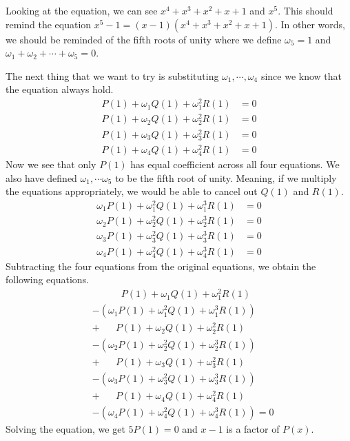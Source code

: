 \documentclass[../../main.tex]{subfiles}
\begin{document}
\begin{solution}
Looking at the equation, we can see $x^4 + x^3 + x^2 + x + 1$ and
$x^5$. This should remind the equation $x^5 - 1 = (x - 1)
(x^4 + x^3 + x^2 + x + 1)$. In other words, we should be reminded of
the fifth roots of unity where we define $\omega_5 = 1$ and
$\omega_1 + \omega_2 + \cdots + \omega_5 = 0$.

The next thing that we want to try is substituting $\omega_1, \cdots,
\omega_4$ since we know that the equation always hold.
\begin{align*}
    P(1) + \omega_1 Q(1) + \omega_1^2 R(1) &= 0 \\
    P(1) + \omega_2 Q(1) + \omega_2^2 R(1) &= 0 \\
    P(1) + \omega_3 Q(1) + \omega_3^2 R(1) &= 0 \\
    P(1) + \omega_4 Q(1) + \omega_4^2 R(1) &= 0
\end{align*}
Now we see that only $P(1)$ has equal coefficient across all four
equations. We also have defined $\omega_1, \cdots \omega_5$ to be
the fifth root of unity. Meaning, if we multiply the equations
appropriately, we would be able to cancel out $Q(1)$ and $R(1)$.
\begin{align*}
    \omega_1 P(1) + \omega_1^2 Q(1) + \omega_1^3 R(1) &= 0 \\
    \omega_2 P(1) + \omega_2^2 Q(1) + \omega_2^3 R(1) &= 0 \\
    \omega_3 P(1) + \omega_3^2 Q(1) + \omega_3^3 R(1) &= 0 \\
    \omega_4 P(1) + \omega_4^2 Q(1) + \omega_4^3 R(1) &= 0
\end{align*}
Subtracting the four equations from the original equations,
we obtain the following equations.
\begin{align*}
    &\qquad\quad P(1) + \omega_1 Q(1) + \omega_1^2 R(1) \\
    &-\left(
        \omega_1 P(1) + \omega_1^2 Q(1) + \omega_1^3 R(1)
    \right) \\
    &+ \quad\ \ \ P(1) + \omega_2 Q(1) + \omega_2^2 R(1) \\
    &-\left(
        \omega_2 P(1) + \omega_2^2 Q(1) + \omega_2^3 R(1)
    \right) \\
    &+ \quad\ \ \ P(1) + \omega_3 Q(1) + \omega_3^2 R(1) \\
    &-\left(
        \omega_3 P(1) + \omega_3^2 Q(1) + \omega_3^3 R(1)
    \right) \\
    &+ \quad\ \ \ P(1) + \omega_4 Q(1) + \omega_4^2 R(1) \\
    &-\left(
        \omega_4 P(1) + \omega_4^2 Q(1) + \omega_4^3 R(1)
    \right) = 0
\end{align*}
Solving the equation, we get $5 P(1) = 0$ and $x - 1$ is a factor
of $P(x)$.
\end{solution}
\end{document}
